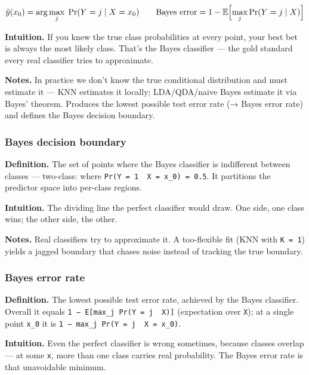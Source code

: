\documentclass[
  10pt,
  letterpaper,
  onecolumn]{article}
\begin{document}
\begin{equation*}
\hat y(x_0)=\arg\max_{j}\;\Pr(Y=j\mid X=x_0)
\qquad
\text{Bayes error}=1-\mathbb{E}\Bigl[\max_j \Pr(Y=j\mid X)\Bigr]
\end{equation*}

\textbf{Intuition.} If you knew the true class probabilities at every
point, your best bet is always the most likely class. That's the Bayes
classifier --- the gold standard every real classifier tries to
approximate.

\textbf{Notes.} In practice we don't know the true conditional
distribution and must estimate it --- KNN estimates it locally;
LDA/QDA/naive Bayes estimate it via Bayes' theorem. Produces the lowest
possible test error rate (→ Bayes error rate) and defines the Bayes
decision boundary.

\hypertarget{bayes-decision-boundary}{%
\subsubsection{Bayes decision boundary}\label{bayes-decision-boundary}}

\textbf{Definition.} The set of points where the Bayes classifier is
indifferent between classes --- two-class: where
\texttt{Pr(Y\ =\ 1\ \textbar{}\ X\ =\ x\_0)\ =\ 0.5}. It partitions the
predictor space into per-class regions.

\textbf{Intuition.} The dividing line the perfect classifier would draw.
One side, one class wins; the other side, the other.

\textbf{Notes.} Real classifiers try to approximate it. A too-flexible
fit (KNN with \texttt{K\ =\ 1}) yields a jagged boundary that chases
noise instead of tracking the true boundary.

\hypertarget{bayes-error-rate}{%
\subsubsection{Bayes error rate}\label{bayes-error-rate}}

\textbf{Definition.} The lowest possible test error rate, achieved by
the Bayes classifier. Overall it equals
\texttt{1\ −\ E{[}max\_j\ Pr(Y\ =\ j\ \textbar{}\ X){]}} (expectation
over \texttt{X}); at a single point \texttt{x\_0} it is
\texttt{1\ −\ max\_j\ Pr(Y\ =\ j\ \textbar{}\ X\ =\ x\_0)}.

\textbf{Intuition.} Even the perfect classifier is wrong sometimes,
because classes overlap --- at some \texttt{x}, more than one class
carries real probability. The Bayes error rate is that unavoidable
minimum.
\end{document}
